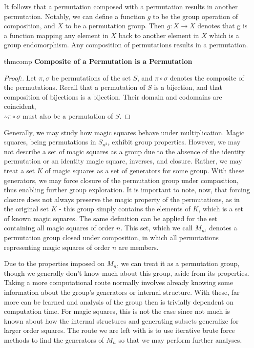 \documentclass[12pt]{report}
\begin{document}
\par It follows that a permutation composed with a permutation results in another permutation.
Notably, we can define a function $g$ to be the group operation of composition, and $X$ to be a
permutation group. Then $g:X\rightarrow X$ denotes that g is a function mapping any element in $X$
back to another element in $X$ which is a group endomorphism. Any composition of permutations
results in a permutation.

\singlespacing{}
\begin{thmbox}{}{thmcomp}
  \textbf{Composite of a Permutation is a Permutation}
  \begin{proof}[Proof:]
    Let $\pi,\sigma$ be permutations of the set $S$, and $\pi\circ\sigma$ denotes the composite of
    the permutations. Recall that a permutation of $S$ is a bijection, and that composition of
    bijections is a bijection. Their domain and codomains are coincident,\\ $\therefore
      \pi\circ\sigma$
    must also be a permutation of $S$.
  \end{proof}
\end{thmbox}
\doublespacing{}

\par Generally, we may study how magic squares behave under multiplication. Magic squares, being
permutations in $S_{n^2}$, exhibit group properties. However, we may not describe a set of magic
squares as a group due to the absence of the identity permutation or an identity magic square,
inverses, and closure. Rather, we may treat a set $K$ of magic squares as a set of generators for
some group. With these generators, we may force closure of the permutation group under composition,
thus enabling further group exploration. It is important to note, now, that forcing closure does
not always preserve the magic property of the permutations, as in the original set $K$ \hyphen{}
this group simply contains the elements of $K$, which is a set of known magic squares. The same
definition can be applied for the set containing all magic squares of order $n$. This set, which we
call $M_n$, denotes a permutation group closed under composition, in which all permutations
representing magic squares of order $n$ are members.

\par Due to the properties imposed on $M_n$, we can treat it as a permutation group, though we
generally don't know much about this group, aside from its properties. Taking a more computational
route normally involves already knowing some information about the group's generators or internal
structure. With these, far more can be learned and analysis of the group then is trivially
dependent on computation time. For magic squares, this is not the case since not much is known
about how the internal structures and generating subsets generalize for larger order squares. The
route we are left with is to use iterative brute force methods to find the generators of $M_n$ so
that we may perform further analyses.
\end{document}
